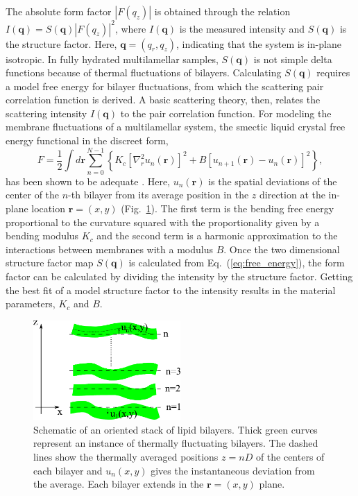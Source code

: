 The absolute form factor $|F(q_z)|$ is obtained through the relation
$I(\mathbf{q})= S(\mathbf{q})|F(q_z)|^2$, where $I(\mathbf{q})$ is the 
measured intensity and $S(\mathbf{q})$ is the structure factor.
Here, $\mathbf{q} = (q_r, q_z)$, indicating that the system is in-plane isotropic. 
In fully hydrated multilamellar samples, $S(\mathbf{q})$ is not simple delta 
functions because of thermal fluctuations of bilayers. Calculating $S(\mathbf{q})$
requires a model free energy for bilayer fluctuations, from which the scattering
pair correlation function is derived. A basic scattering theory, then, relates
the scattering intensity $I(\mathbf{q})$ to the pair correlation function. 
For modeling the membrane fluctuations of a multilamellar system, 
the smectic liquid crystal free energy functional in the discreet form,
\begin{equation}
  F=\frac{1}{2}\int d\mathbf{r}\sum _{n=0}^{N-1}\left\{ 
  K_{c} \left[\nabla _{r}^{2}u_{n}\left(\mathbf{r}\right)\right]^{2}
  +B\left[u_{n+1}\left(\mathbf{r}\right)-u_{n}\left(\mathbf{r}\right)\right]^{2}
  \right\},
  \label{eq:free_energy}
\end{equation}
has been shown to be adequate \cite{Lyatskaya01}.
Here, $u_{n}\left(\mathbf{r}\right)$ is the spatial deviations of the center 
of the $n$-th bilayer from its average position in the $z$ direction
at the in-plane location $\mathbf{r}=(x,y)$ (Fig.~\ref{fig:stack}).
The first term is the bending free energy proportional to the curvature
squared with the proportionality given by a bending modulus $K_{c}$ and
the second term is a harmonic approximation to the interactions between
membranes with a modulus $B$. 
Once the two dimensional structure factor map $S(\mathbf{q})$ is calculated 
from Eq.~(\ref{eq:free_energy}), the form factor can 
be calculated by dividing the intensity by the structure factor. 
Getting the best fit of a model structure factor to the intensity results in 
the material parameters, $K_c$ and $B$.

\begin{figure}[htbp]
  \centering
  \includegraphics[width=0.5\textwidth]{figures/Tat/MMs/stack}
  \caption{Schematic of an oriented stack of lipid bilayers. Thick green curves
  represent an instance of thermally fluctuating bilayers. The dashed lines 
  show the thermally averaged positions $z=nD$ of the centers of each bilayer 
  and $u_{n}(x,y)$ gives the instantaneous deviation from the average. 
  Each bilayer extends in the $\mathbf{r}=\left(x,y\right)$ plane.}
  \label{fig:stack}
\end{figure}

